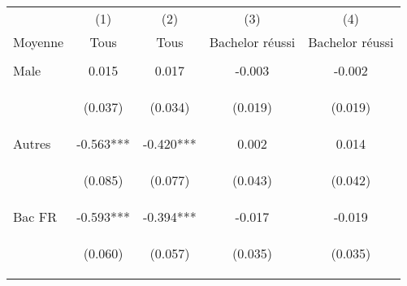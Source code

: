 \begin{center}
\begin{tabular}{lcccc} \hline
 & (1) & (2) & (3) & (4) \\
Moyenne & Tous & Tous & Bachelor réussi & Bachelor réussi \\ \hline
\vspace{4pt} & \begin{footnotesize}\end{footnotesize} & \begin{footnotesize}\end{footnotesize} & \begin{footnotesize}\end{footnotesize} & \begin{footnotesize}\end{footnotesize} \\
Male & 0.015 & 0.017 & -0.003 & -0.002 \\
\vspace{4pt} & \begin{footnotesize}(0.037)\end{footnotesize} & \begin{footnotesize}(0.034)\end{footnotesize} & \begin{footnotesize}(0.019)\end{footnotesize} & \begin{footnotesize}(0.019)\end{footnotesize} \\
Autres & -0.563*** & -0.420*** & 0.002 & 0.014 \\
\vspace{4pt} & \begin{footnotesize}(0.085)\end{footnotesize} & \begin{footnotesize}(0.077)\end{footnotesize} & \begin{footnotesize}(0.043)\end{footnotesize} & \begin{footnotesize}(0.042)\end{footnotesize} \\
Bac FR & -0.593*** & -0.394*** & -0.017 & -0.019 \\
\vspace{4pt} & \begin{footnotesize}(0.060)\end{footnotesize} & \begin{footnotesize}(0.057)\end{footnotesize} & \begin{footnotesize}(0.035)\end{footnotesize} & \begin{footnotesize}(0.035)\end{footnotesize} \\

\end{tabular}
\end{center}
